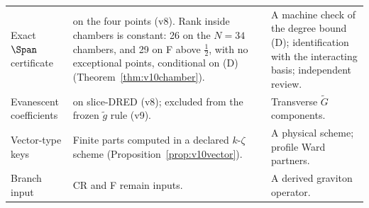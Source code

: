 \begin{longtable}{@{}L{.22\linewidth}L{.40\linewidth}L{.31\linewidth}@{}}
Exact \(\Span\) certificate &
\CPIR{} on the four points (v8). Rank inside chambers is constant: 26 on the
\(N=34\) chambers, and 29 on F above \(\tfrac12\), with no exceptional points,
conditional on (D) (Theorem~\ref{thm:v10chamber}). &
A machine check of the degree bound (D); identification with the
interacting basis; independent review.\\

Evanescent coefficients &
\CONDITIONAL{} on slice-DRED (v8); excluded from the frozen
\(\tilde g\) rule (v9). &
Transverse \(\tilde G\) components.\\

Vector-type keys &
Finite parts computed in a declared \(k\)-\(\zeta\) scheme
(Proposition~\ref{prop:v10vector}). &
A physical scheme; profile Ward partners.\\

Branch input &
CR and F remain inputs. &
A derived graviton operator.\\
\end{longtable}
\endgroup
